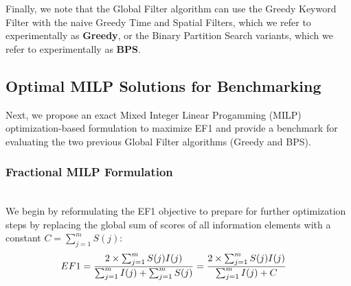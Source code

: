 

Finally, we note that the Global Filter algorithm can use the Greedy Keyword Filter with the naive Greedy Time and Spatial Filters, which we refer to experimentally as {\bf Greedy}, or the Binary Partition Search variants, which we refer to experimentally as {\bf BPS}.  



\subsection{Optimal MILP Solutions for Benchmarking}

Next, we propose an exact Mixed Integer Linear Progamming (MILP) optimization-based formulation to maximize EF1 and provide a benchmark for evaluating the two previous Global Filter algorithms (Greedy and BPS).  %

\subsubsection{Fractional MILP Formulation} \hfill \\
We begin by reformulating the EF1 objective to prepare for further optimization steps by replacing the global sum of scores of all information elements with a constant $C = \sum_{j=1}^m S(j)$:
\begin{equation}
\begin{aligned}
    \emph{$EF1$} &= \dfrac{2\times \sum_{j=1}^m S(j)I(j)}{\sum_{j=1}^m I(j) + \sum_{j=1}^m S(j)} = \dfrac{2 \times \sum_{j=1}^m S(j)I(j)}{\sum_{j=1}^m I(j) + C}
\end{aligned}
\end{equation}

